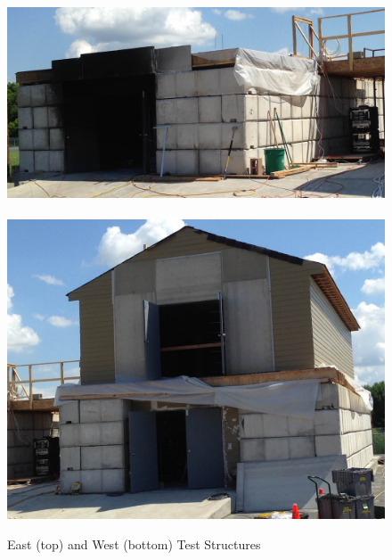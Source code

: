 \documentclass[12pt,oneside]{book}
\begin{document}
\begin{figure}[!ht]
\includegraphics[width=6in]{../Pictures/east_structure}
\\~\\
\includegraphics[width=6in]{../Pictures/west_structure}
\caption[East and West Test Structures]{East (top) and West (bottom) Test Structures}
\label{fig:struct_pics}
\end{figure}
\end{document}
